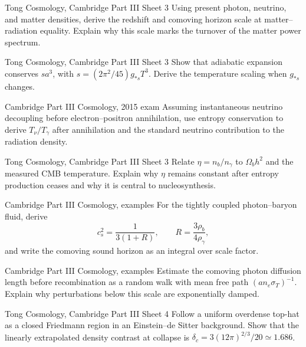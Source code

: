 \begin{exercise}{Tong Cosmology, Cambridge Part III Sheet 3}
Using present photon, neutrino, and matter densities, derive the redshift and
comoving horizon scale at matter--radiation equality.  Explain why this scale
marks the turnover of the matter power spectrum.
\end{exercise}

\begin{exercise}{Tong Cosmology, Cambridge Part III Sheet 3}
Show that adiabatic expansion conserves \(s a^3\), with
\(s=(2\pi^2/45)g_{\ast s}T^3\).  Derive the temperature scaling when
\(g_{\ast s}\) changes.
\end{exercise}

\begin{exercise}{Cambridge Part III Cosmology, 2015 exam}
Assuming instantaneous neutrino decoupling before electron--positron
annihilation, use entropy conservation to derive \(T_\nu/T_\gamma\) after
annihilation and the standard neutrino contribution to the radiation density.
\end{exercise}

\begin{exercise}{Tong Cosmology, Cambridge Part III Sheet 3}
Relate \(\eta=n_b/n_\gamma\) to \(\Omega_bh^2\) and the measured CMB
temperature.  Explain why \(\eta\) remains constant after entropy production
ceases and why it is central to nucleosynthesis.
\end{exercise}

\begin{exercise}{Cambridge Part III Cosmology, examples}
For the tightly coupled photon--baryon fluid, derive
\[
c_s^2=\frac{1}{3(1+R)},\qquad R=\frac{3\rho_b}{4\rho_\gamma},
\]
and write the comoving sound horizon as an integral over scale factor.
\end{exercise}

\begin{exercise}{Cambridge Part III Cosmology, examples}
Estimate the comoving photon diffusion length before recombination as a random
walk with mean free path \((a n_e\sigma_T)^{-1}\).  Explain why perturbations
below this scale are exponentially damped.
\end{exercise}

\begin{exercise}{Tong Cosmology, Cambridge Part III Sheet 4}
Follow a uniform overdense top-hat as a closed Friedmann region in an
Einstein--de Sitter background.  Show that the linearly extrapolated density
contrast at collapse is
\(\delta_c=3(12\pi)^{2/3}/20\simeq1.686\).
\end{exercise}

